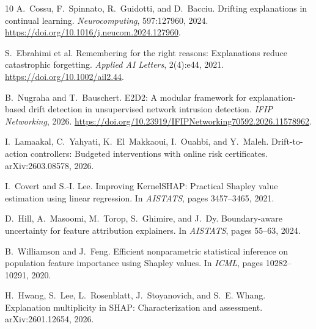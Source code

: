 \documentclass[10pt]{article}
\begin{document}
\begin{thebibliography}{10}
A.~Cossu, F.~Spinnato, R.~Guidotti, and D.~Bacciu.
\newblock Drifting explanations in continual learning.
\newblock \emph{Neurocomputing}, 597:127960, 2024.
\newblock \url{https://doi.org/10.1016/j.neucom.2024.127960}.

S.~Ebrahimi et al.
\newblock Remembering for the right reasons: Explanations reduce catastrophic forgetting.
\newblock \emph{Applied AI Letters}, 2(4):e44, 2021.
\newblock \url{https://doi.org/10.1002/ail2.44}.

B.~Nugraha and T.~Bauschert.
\newblock E2D2: A modular framework for explanation-based drift detection in unsupervised network intrusion detection.
\newblock \emph{IFIP Networking}, 2026.
\newblock \url{https://doi.org/10.23919/IFIPNetworking70592.2026.11578962}.

I.~Lamaakal, C.~Yahyati, K.~El~Makkaoui, I.~Ouahbi, and Y.~Maleh.
\newblock Drift-to-action controllers: Budgeted interventions with online risk certificates.
\newblock arXiv:2603.08578, 2026.

I.~Covert and S.-I. Lee.
\newblock Improving KernelSHAP: Practical Shapley value estimation using linear regression.
\newblock In \emph{AISTATS}, pages 3457--3465, 2021.

D.~Hill, A.~Masoomi, M.~Torop, S.~Ghimire, and J.~Dy.
\newblock Boundary-aware uncertainty for feature attribution explainers.
\newblock In \emph{AISTATS}, pages 55--63, 2024.

B.~Williamson and J.~Feng.
\newblock Efficient nonparametric statistical inference on population feature importance using Shapley values.
\newblock In \emph{ICML}, pages 10282--10291, 2020.

H.~Hwang, S.~Lee, L.~Rosenblatt, J.~Stoyanovich, and S.~E. Whang.
\newblock Explanation multiplicity in SHAP: Characterization and assessment.
\newblock arXiv:2601.12654, 2026.
\end{thebibliography}
\end{document}
